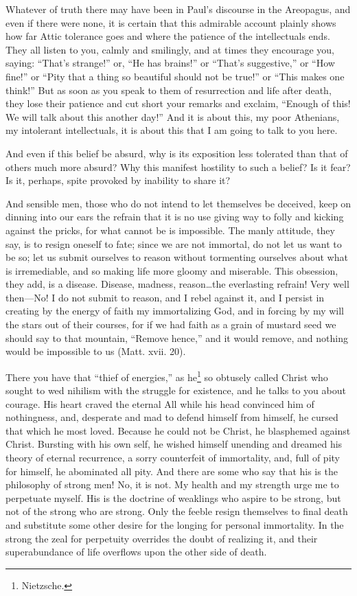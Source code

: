 Whatever of truth there may have been in Paul's discourse in the
Areopagus, and even if there were none, it is certain that this
admirable account plainly shows how far Attic tolerance goes and where
the patience of the intellectuals ends. They all listen to you, calmly
and smilingly, and at times they encourage you, saying: ``That's
strange!'' or, ``He has brains!'' or ``That's suggestive,'' or ``How
fine!'' or ``Pity that a thing so  beautiful should not be
true!'' or ``This makes one think!'' But as soon as you speak to them
of resurrection and life after death, they lose their patience and cut
short your remarks and exclaim, ``Enough of this! We will talk about
this another day!'' And it is about this, my poor Athenians, my
intolerant intellectuals, it is about this that I am going to talk to
you here.

And even if this belief be absurd, why is its exposition less
tolerated than that of others much more absurd? Why this manifest
hostility to such a belief? Is it fear? Is it, perhaps, spite provoked
by inability to share it?

And sensible men, those who do not intend to let themselves be
deceived, keep on dinning into our ears the refrain that it is no use
giving way to folly and kicking against the pricks, for what cannot be
is impossible. The manly attitude, they say, is to resign oneself to
fate; since we are not immortal, do not let us want to be so; let us
submit ourselves to reason without tormenting ourselves about what is
irremediable, and so making life more gloomy and miserable. This
obsession, they add, is a disease. Disease, madness, reason\ldots the
everlasting refrain! Very well then---No! I do not submit to reason,
and I rebel against it, and I persist in creating by the energy of
faith my immortalizing God, and in forcing by my will the stars out of
their courses, for if we had faith as a grain of mustard seed we
should say to that mountain, ``Remove hence,'' and it would remove,
and nothing would be impossible to us (Matt. xvii. 20).

There you have that ``thief of energies,'' as he\footnote{Nietzsche.}
so obtusely called Christ who sought to wed nihilism with the struggle
for existence, and he talks to you about courage. His heart craved the
eternal All while his head convinced him of nothingness, and,
desperate and mad to defend himself from himself, he cursed that which
he  most loved. Because he could not be Christ, he blasphemed
against Christ. Bursting with his own self, he wished himself unending
and dreamed his theory of eternal recurrence, a sorry counterfeit of
immortality, and, full of pity for himself, he abominated all pity.
And there are some who say that his is the philosophy of strong men!
No, it is not. My health and my strength urge me to perpetuate myself.
His is the doctrine of weaklings who aspire to be strong, but not of
the strong who are strong. Only the feeble resign themselves to final
death and substitute some other desire for the longing for personal
immortality. In the strong the zeal for perpetuity overrides the doubt
of realizing it, and their superabundance of life overflows upon the
other side of death.

